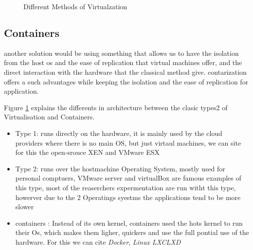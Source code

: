
\begin{figure}
    \caption{Different Methods of Virtualzation}\label{environement:virtualization_technique}
\end{figure}

\subsection{Containers}

another solution would be using something that allows us to have the isolation from the host os and the ease of replication that virtual machines offer, and the direct interaction with the hardware that the classical method give.
contarization offers a such advantages while keeping the isolation and the ease of replication for application.

Figure \ref{environement:virtualization_technique} explains the differents in architecture between the clasic types2 of Virtualisation and Containers.
\begin{itemize}
    \item Type 1: runs directly on the hardware, it is mainly used by the cloud providers where there is no main OS, but just virtaul machines, we can site for this the open-srouce XEN and VMware ESX
    \item Type 2: runs over the hostmachine Operating System, mostly used for personal comptuers, VMware server and virtualBox are famous examples of this type, most of the reaserchers expermentation are run witht this type, howerver due to the 2 Operatings syestms the applications tend to be more slower
    \item containers : Instead of its own kernel, containers used the hots kernel to run their Os, which makes them ligher, quickers and use the full pontial use of the hardware. For this we can cite \emph{Docker}, \emph{Linux LXC}\emph{LXD} \cite{abuabdo_virtualization_2019}
\end{itemize}


